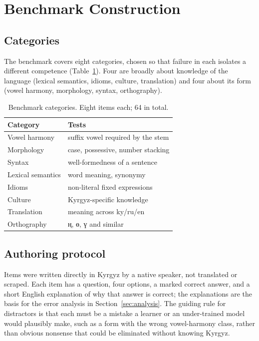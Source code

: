 \documentclass[11pt]{article}
\newcommand{\ky}[1]{\foreignlanguage{russian}{#1}}
\begin{document}
\section{Benchmark Construction}
\label{sec:benchmark}

\subsection{Categories}

The benchmark covers eight categories, chosen so that failure in each isolates a
different competence (Table~\ref{tab:categories}). Four are broadly about knowledge
of the language (lexical semantics, idioms, culture, translation) and four about its
form (vowel harmony, morphology, syntax, orthography).

\begin{table}[h]
\centering
\small
\begin{tabular}{ll}
\toprule
Category & Tests \\
\midrule
Vowel harmony      & suffix vowel required by the stem \\
Morphology         & case, possessive, number stacking \\
Syntax             & well-formedness of a sentence \\
Lexical semantics  & word meaning, synonymy \\
Idioms             & non-literal fixed expressions \\
Culture            & Kyrgyz-specific knowledge \\
Translation        & meaning across ky/ru/en \\
Orthography        & \ky{ң}, \ky{ө}, \ky{ү} and similar \\
\bottomrule
\end{tabular}
\caption{Benchmark categories. Eight items each; 64 in total.}
\label{tab:categories}
\end{table}

\subsection{Authoring protocol}

Items were written directly in Kyrgyz by a native speaker, not translated or scraped.
Each item has a question, four options, a marked correct answer, and a short English
explanation of why that answer is correct; the explanations are the basis for the
error analysis in Section~\ref{sec:analysis}. The guiding rule for distractors is that
each must be a mistake a learner or an under-trained model would plausibly make, such
as a form with the wrong vowel-harmony class, rather than obvious nonsense that could
be eliminated without knowing Kyrgyz.
\end{document}
